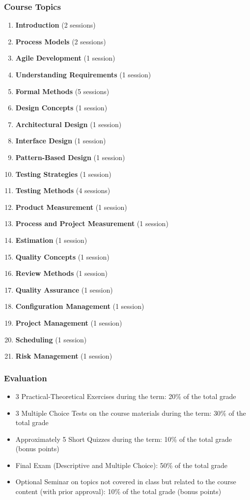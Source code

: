 \documentclass[12pt]{article}
\begin{document}
\subsubsection*{Course Topics}
\begin{enumerate}
    \item \textbf{Introduction} (2 sessions)
    \item \textbf{Process Models} (2 sessions)
    \item \textbf{Agile Development} (1 session)
    \item \textbf{Understanding Requirements} (1 session)
    \item \textbf{Formal Methods} (5 sessions)
    \item \textbf{Design Concepts} (1 session)
    \item \textbf{Architectural Design} (1 session)
    \item \textbf{Interface Design} (1 session)
    \item \textbf{Pattern-Based Design} (1 session)
    \item \textbf{Testing Strategies} (1 session)
    \item \textbf{Testing Methods} (4 sessions)
    \item \textbf{Product Measurement} (1 session)
    \item \textbf{Process and Project Measurement} (1 session)
    \item \textbf{Estimation} (1 session)
    \item \textbf{Quality Concepts} (1 session)
    \item \textbf{Review Methods} (1 session)
    \item \textbf{Quality Assurance} (1 session)
    \item \textbf{Configuration Management} (1 session)
    \item \textbf{Project Management} (1 session)
    \item \textbf{Scheduling} (1 session)
    \item \textbf{Risk Management} (1 session)
\end{enumerate}

\subsubsection*{Evaluation}
\begin{itemize}
    \item 3 Practical-Theoretical Exercises during the term: 20\% of the total grade
    \item 3 Multiple Choice Tests on the course materials during the term: 30\% of the total grade
    \item Approximately 5 Short Quizzes during the term: 10\% of the total grade (bonus points)
    \item Final Exam (Descriptive and Multiple Choice): 50\% of the total grade
    \item Optional Seminar on topics not covered in class but related to the course content (with prior approval): 10\% of the total grade (bonus points)
\end{itemize}
\end{document}

